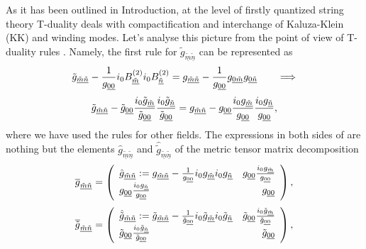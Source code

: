 \documentclass[a4paper,11pt]{article}
\begin{document}
As it has been outlined in Introduction,
at the level of firstly quantized string theory T-duality deals
with compactification and interchange of Kaluza-Klein (KK) and winding
modes. Let's analyse this picture from the point of view of T-duality
rules . Namely, the first rule for $\tilde{g}_{\underline{\tilde m}
\underline{\tilde n}}$ can be represented as
$$
\tilde{g}_{\underline{\tilde m}\underline{\tilde n}}
-{1\over g_{\underline{00}}}i_0 B^{(2)}_{\underline{\tilde m}}
i_0 B^{(2)}_{\underline{\tilde n}}=g_{\underline{\tilde m}\underline{\tilde n}}
-{1\over g_{\underline{00}}}g_{\underline{0}\underline{\tilde m}}
g_{\underline{0}\underline{\tilde n}} \qquad  \Longrightarrow
$$
\begin{equation}\plabel{TRg1}
\tilde{g}_{\underline{\tilde m}\underline{\tilde n}}
-\tilde{g}_{\underline{00}}{i_0 \tilde{g}_{\underline{\tilde m}}\over
\tilde{g}_{\underline{00}}}
{i_0 \tilde{g}_{\underline{\tilde n}}\over
\tilde{g}_{\underline{00}}}=g_{\underline{\tilde m}\underline{\tilde n}}
-g_{\underline{00}} {i_0 g_{\underline{\tilde m}}\over
g_{\underline{00}}}
{i_0 g_{\underline{\tilde n}}\over
g_{\underline{00}}},
\end{equation}
where we have used the rules for other fields. The expressions in both sides
of  are nothing but the elements $\hat{g}_{\underline{\tilde m}
\underline{\tilde n}}$ and $\hat{\tilde g}_{\underline{\tilde m}
\underline{\tilde n}}$ of the metric tensor matrix decomposition
$$
\overline{g}_{\underline{\tilde m}\underline{\tilde n}}=
\left(\begin{array}{lr}
\hat{g}_{\underline{\tilde m}
\underline{\tilde n}}:=
g_{\underline{\tilde m}\underline{\tilde n}}-{1\over
g_{\underline{0}\underline{0}}}i_0 g_{\underline{\tilde m}} i_0
g_{\underline{\tilde n}}
&
g_{\underline{0}\underline{0}} {i_0
g_{\underline{\tilde m}}\over g_{\underline{0}\underline{0}}}
\\
g_{\underline{0}\underline{0}} {i_0
g_{\underline{\tilde n}}\over g_{\underline{0}\underline{0}}}
& g_{\underline{0}\underline{0}}
\end{array} \right),
$$
$$
\overline{\tilde g}_{\underline{\tilde m}\underline{\tilde n}}=
\left(\begin{array}{lr}
\hat{\tilde g}_{\underline{\tilde m}
\underline{\tilde n}}:=
\tilde{g}_{\underline{\tilde m}\underline{\tilde n}}-{1\over
{\tilde g}_{\underline{0}\underline{0}}}i_0{\tilde g}_{\underline{\tilde m}}
i_0{\tilde g}_{\underline{\tilde n}}
&
\tilde{g}_{\underline{0}\underline{0}} {i_0
{\tilde g}_{\underline{\tilde m}}\over {\tilde g}_{\underline{0}\underline{0}}}
\\
{\tilde g}_{\underline{0}\underline{0}} {i_0
\tilde{g}_{\underline{\tilde n}}\over {\tilde g}_{\underline{0}\underline{0}}}
& {\tilde g}_{\underline{0}\underline{0}}
\end{array} \right),
$$
\end{document}
